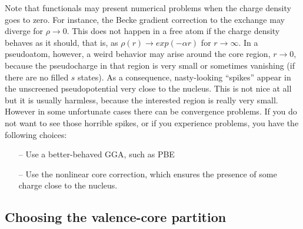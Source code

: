 Note that functionals may present numerical problems
when the charge density goes to zero. For instance, the Becke
gradient correction to the exchange may diverge for 
$\rho \rightarrow 0$. This does not happen in a free atom
if the charge density behaves as it should, that is, as
$\rho(r)\rightarrow exp(-\alpha r)$ for $r \rightarrow \infty$.
In a pseudoatom, however, a weird behavior may arise 
around the core region, $r\rightarrow 0$, because the 
pseudocharge in that region is very small or sometimes 
vanishing (if there are no filled $s$ states). As a consequence,
nasty-looking ``spikes'' appear in the unscreened pseudopotential
very close to the nucleus. This is not nice at all but it is
usually harmless, because the interested region is really 
very small. However in some unfortunate cases there can be 
convergence problems. If you do not want to see those horrible 
spikes, or if you experience problems, you have the following
choices:
\begin{enumerate}
\item[--] Use a better-behaved GGA, such as PBE
\item[--] Use the nonlinear core correction,
which  ensures the presence of some charge close to the nucleus.
\end{enumerate}

\subsection{Choosing the valence-core partition}

